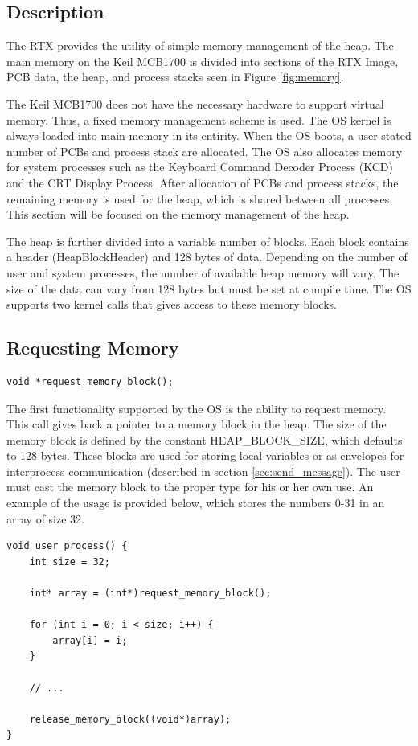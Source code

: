 \documentclass[12pt]{report}
\begin{document}
\subsection{Description}
The RTX provides the utility of simple memory management of the heap. The main memory on the Keil MCB1700 is divided into sections of the RTX Image, PCB data, the heap, and process stacks seen in Figure \ref{fig:memory}.

The Keil MCB1700 does not have the necessary hardware to support virtual memory. Thus, a fixed memory management scheme is used. The OS kernel is always loaded into main memory in its entirity. When the OS boots, a user stated number of PCBs and process stack are allocated. The OS also allocates memory for system processes such as the Keyboard Command Decoder Process (KCD) and the CRT Display Process. After allocation of PCBs and process stacks, the remaining memory is used for the heap, which is shared between all processes. This section will be focused on the memory management of the heap.

The heap is further divided into a variable number of blocks. Each block contains a header (HeapBlockHeader) and 128 bytes of data. Depending on the number of user and system processes, the number of available heap memory will vary. The size of the data can vary from 128 bytes but must be set at compile time. The OS supports two kernel calls that gives access to these memory blocks.

\subsection{Requesting Memory}
\label{sec:request_memory}
\begin{lstlisting}
void *request_memory_block();
\end{lstlisting}
\par The first functionality supported by the OS is the ability to request memory. This call gives back a pointer to a memory block in the heap. The size of the memory block is defined by the constant HEAP\_BLOCK\_SIZE, which defaults to 128 bytes. These blocks are used for storing local variables or as envelopes for interprocess communication (described in section \ref{sec:send_message}). The user must cast the memory block to the proper type for his or her own use. An example of the usage is provided below, which stores the numbers 0-31 in an array of size 32.
\begin{lstlisting}
void user_process() {
    int size = 32;

    int* array = (int*)request_memory_block();

    for (int i = 0; i < size; i++) {
        array[i] = i;
    }

    // ...

    release_memory_block((void*)array);
}
\end{lstlisting}
\end{document}
